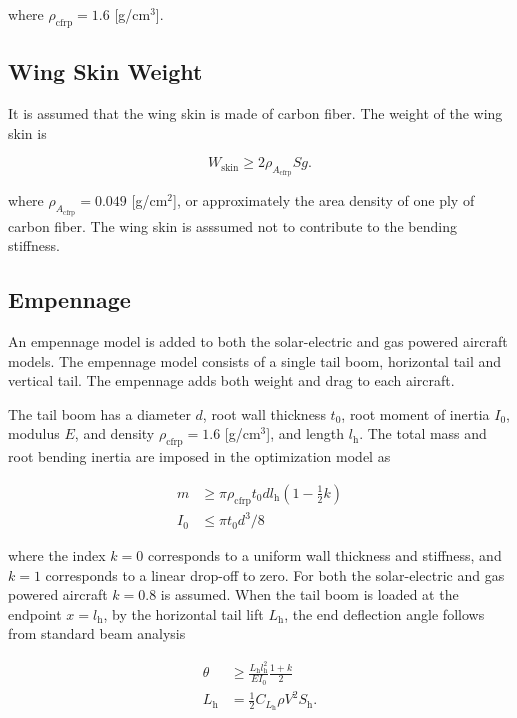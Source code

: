 where $\rho_{\text{cfrp}} = 1.6$ [g/cm$^3$].\cite{cfply}

\subsection{Wing Skin Weight}

It is assumed that the wing skin is made of carbon fiber.  The weight of the wing skin is 

\begin{equation}
    \label{e:wingskinweight}
    W_{\text{skin}} \geq 2 \rho_{A_{\text{cfrp}}} S g.
\end{equation}

where $\rho_{A_{\text{cfrp}}} = 0.049$ [g/cm$^2$], or approximately the area density of one ply of carbon fiber.\cite{cfply} The wing skin is asssumed not to contribute to the bending stiffness. 

\subsection{Empennage}

An empennage model is added to both the solar-electric and gas powered aircraft models.  The empennage model consists of a single tail boom, horizontal tail and vertical tail.  
The empennage adds both weight and drag to each aircraft.  

The tail boom has a diameter $d$, root wall thickness $t_0$, root moment of inertia $I_0$, modulus $E$, and density $\rho_{\text{cfrp}} = 1.6$ [g/cm$^3$], and length $l_{\text{h}}$. 
The total mass and root bending inertia are imposed in the optimization model as 

\begin{align}
    m &\geq \pi \rho_{\text{cfrp}} t_0 d l_{\text{h}} \left( 1 - \frac{1}{2} k\right) \\
    I_0 &\leq \pi t_0 d^3/8
\end{align}

where the index $k=0$ corresponds to a uniform wall thickness and stiffness, and $k=1$ corresponds to a linear drop-off to zero.  For both the solar-electric and gas powered aircraft $k=0.8$ is assumed.  
When the tail boom is loaded at the endpoint $x=l_{\text{h}}$, by the horizontal tail lift $L_{\text{h}}$, the end deflection angle follows from standard beam analysis

\begin{align}
    \label{e:boomdefl}
    \theta &\geq \frac{L_{\text{h}} l_{\text{h}}^2}{EI_0} \frac{1+k}{2} \\
    L_{\text{h}} &= \frac{1}{2} C_{L_{\text{h}}} \rho V^2 S_{\text{h}}.
\end{align}

